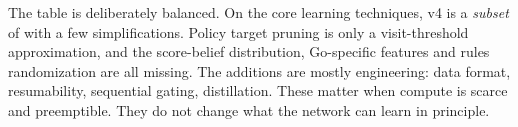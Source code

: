 The table is deliberately balanced. On the core learning techniques, v4 is a
\emph{subset} of \katago{} with a few simplifications. Policy target pruning is only a
visit-threshold approximation, and the score-belief distribution, Go-specific features
and rules randomization are all missing. The additions
are mostly engineering: data format, resumability, sequential gating, distillation. These
matter when compute is scarce and preemptible. They do not change what the network can
learn in principle.
